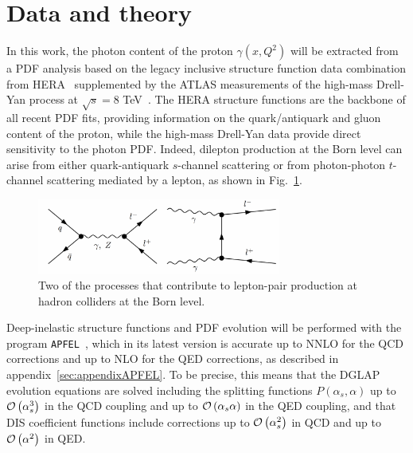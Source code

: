 \section{Data and theory}
\label{sec:theory}

In this work, the photon
content of the proton $\gamma(x,Q^2)$ will be extracted from a PDF analysis based
on the legacy inclusive structure function data combination from HERA~\cite{Abramowicz:2015mha}
supplemented by the ATLAS measurements of the high-mass Drell-Yan process
at $\sqrt{s}=8$ TeV~\cite{Aad:2016zzw}.
%
The HERA structure functions are the backbone of all
recent PDF fits, providing information on the quark/antiquark and gluon content of 
the proton, while the high-mass Drell-Yan data provide
direct sensitivity to the photon PDF.
%
Indeed, dilepton production at the Born level can arise  from either quark-antiquark $s$-channel
scattering or from photon-photon $t$-channel scattering mediated by a lepton,
as shown in Fig.~\ref{fig:photoninduced}.

\begin{figure}[h]
  \begin{center}
    \includegraphics[width=8cm]{figs/photoninduced.pdf}
    \end{center}
  \caption{Two of the processes that contribute to lepton-pair
  production at hadron colliders at the Born level.}
\label{fig:photoninduced}
\end{figure}

Deep-inelastic structure functions and PDF evolution will be performed
with the program {\tt APFEL}~\cite{Bertone:2013vaa}, which in its latest
version is accurate up to NNLO for the QCD corrections and up to
NLO for the QED corrections, as described in appendix~\ref{sec:appendixAPFEL}.
%
To be precise, this means that the DGLAP evolution equations are solved including
the splitting functions $P(\alpha_s,\alpha)$ up to $\mathcal{O}\left( \alpha_s^3\right)$ in the QCD
coupling and up to $\mathcal{O}\left( \alpha_s\alpha\right)$ in the QED coupling,
and that DIS coefficient functions include corrections up to $\mathcal{O}\left( \alpha_s^2\right)$
in QCD and up to $\mathcal{O}\left( \alpha^2\right)$ in QED.

